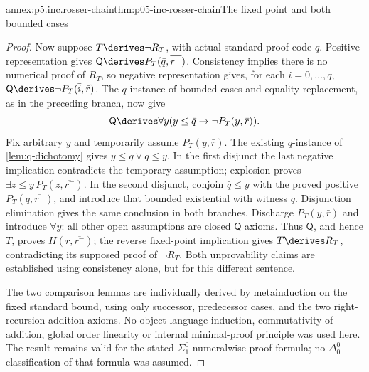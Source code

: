 \begin{annexitem}{annex:p5.inc.rosser-chain}{thm:p05-inc-rosser-chain}{The fixed point and both bounded cases}
\begin{proof}
Now suppose \(T\derives\neg R_T\), with actual standard proof
code \(q\). Positive representation gives
\(\mathsf Q\derives P_T(\bar q,\overline{r^-})\).
Consistency implies there is no numerical proof of \(R_T\), so
negative representation gives, for each \(i=0,\ldots,q\),
\(\mathsf Q\derives\neg P_T(\bar i,\bar r)\).
The \(q\)-instance of bounded cases and equality replacement,
as in the preceding branch, now give
\[
 \mathsf Q\derives\forall y
                   (y\leq\bar q\to\neg P_T(y,\bar r)).
\]
Fix arbitrary \(y\) and temporarily assume \(P_T(y,\bar r)\).
The existing \(q\)-instance of \cref{lem:q-dichotomy} gives
\(y\leq\bar q\lor\bar q\leq y\). In the first disjunct the
last negative implication contradicts the temporary assumption;
explosion proves \(\exists z\leq y\,P_T(z,\overline{r^-})\).
In the second disjunct, conjoin \(\bar q\leq y\) with the
proved positive \(P_T(\bar q,\overline{r^-})\), and introduce
that bounded existential with witness \(\bar q\).
Disjunction elimination gives the same conclusion in both branches.
Discharge \(P_T(y,\bar r)\) and introduce \(\forall y\): all
other open assumptions are closed \(\mathsf Q\) axioms.
Thus \(\mathsf Q\), and hence \(T\), proves
\(H(\bar r,\overline{r^-})\); the reverse fixed-point implication
gives \(T\derives R_T\), contradicting its supposed proof of
\(\neg R_T\). Both unprovability claims are established using
consistency alone, but for this different sentence.

The two comparison lemmas are individually derived by metainduction
on the fixed standard bound, using only successor, predecessor cases,
and the two right-recursion addition axioms. No object-language
induction, commutativity of addition, global order linearity or
internal minimal-proof principle was used here. The result remains
valid for the stated \(\Sigma^0_1\) numeralwise proof formula;
no \(\Delta^0_0\) classification of that formula was assumed.
\end{proof}
\end{annexitem}

